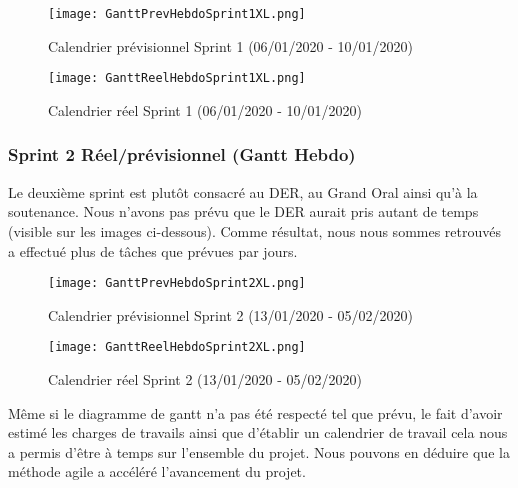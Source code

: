 \begin{figure}[h!]
  \centering
  \texttt{[image: GanttPrevHebdoSprint1XL.png]}
	\caption[]{Calendrier prévisionnel Sprint 1 (06/01/2020 - 10/01/2020)}
	\label{}
\end{figure}

\begin{figure}[h!]
  \centering
  \texttt{[image: GanttReelHebdoSprint1XL.png]}
	\caption[]{Calendrier réel Sprint 1 (06/01/2020 - 10/01/2020)}
	\label{}
\end{figure}



\subsubsection{Sprint 2 Réel/prévisionnel (Gantt Hebdo)}
Le deuxième sprint est plutôt consacré au DER, au Grand Oral ainsi qu’à la soutenance. Nous n’avons pas prévu que le DER aurait pris autant de temps (visible sur les images ci-dessous). Comme résultat, nous nous sommes retrouvés a effectué plus de tâches que prévues par jours. 

\begin{figure}[h!]
  \centering
  \texttt{[image: GanttPrevHebdoSprint2XL.png]}
	\caption[]{Calendrier prévisionnel Sprint 2 (13/01/2020 - 05/02/2020)}
	\label{}
\end{figure}

\begin{figure}[h!]
  \centering
  \texttt{[image: GanttReelHebdoSprint2XL.png]}
	\caption[]{Calendrier réel Sprint 2 (13/01/2020 - 05/02/2020)}
	\label{}
\end{figure}

Même si le diagramme de gantt n'a pas été respecté tel que prévu, le fait d’avoir estimé les charges de travails ainsi que d’établir un calendrier de travail cela nous a permis d’être à temps sur l’ensemble du projet. Nous pouvons en déduire que la méthode agile a accéléré l’avancement du projet.